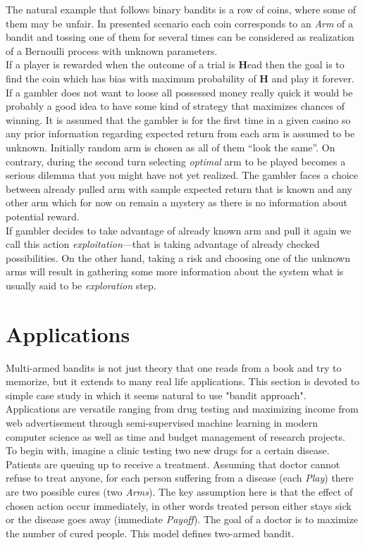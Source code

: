 \documentclass[12pt, a4paper, pdflatex, leqno]{report}
\begin{document}
The natural example that follows binary bandits is a row of coins, where some of them may be unfair. In presented scenario each coin corresponds to an \emph{Arm} of a bandit and tossing one of them for several times can be considered as realization of a Bernoulli process with unknown parameters.\\
If a player is rewarded when the outcome of a trial is \textbf{H}ead then the goal is to find the coin which has bias with maximum probability of \textbf{H} and play it forever.\\

If a gambler does not want to loose all possessed money really quick it would be probably a good idea to have some kind of strategy that maximizes chances of winning. It is assumed that the gambler is for the first time in a given casino so any prior information regarding expected return from each arm is assumed to be unknown. Initially random arm is chosen as all of them ``look the same''. On contrary, during the second turn selecting \emph{optimal} arm to be played becomes a serious dilemma that you might have not yet realized. The gambler faces a choice between already pulled arm with sample expected return that is known and any other arm which for now on remain a mystery as there is no information about potential reward.\\
If gambler decides to take advantage of already known arm and pull it again we call this action \emph{exploitation}---that is taking advantage of already checked possibilities. On the other hand, taking a risk and choosing one of the unknown arms will result in gathering some more information about the system what is usually said to be \emph{exploration} step.\\


\section{Applications} %
Multi-armed bandits is not just theory that one reads from a book and try to memorize, but it extends to many real life applications. This section is devoted to simple case study in which it seems natural to use "bandit approach". Applications are versatile ranging from drug testing and maximizing income from web advertisement through semi-supervised machine learning in modern computer science as well as time and budget management of research projects.\\

To begin with, imagine a clinic testing two new drugs for a certain disease. Patients are queuing up to receive a treatment. Assuming that doctor cannot refuse to treat anyone, for each person suffering from a disease (each \emph{Play}) there are two possible cures (two \emph{Arms}). The key assumption here is that the effect of chosen action occur immediately, in other words treated person either stays sick or the disease goes away (immediate \emph{Payoff}). The goal of a doctor is to maximize the number of cured people. This model defines two-armed bandit.\\
\end{document}
